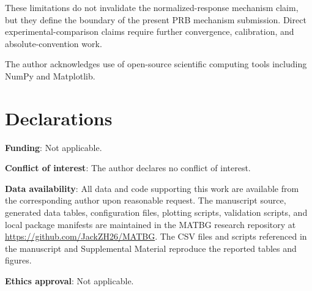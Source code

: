 \documentclass[aps,prb,preprint,superscriptaddress,floatfix,nofootinbib]{revtex4-2}
\begin{document}
These limitations do not invalidate the normalized-response mechanism claim,
but they define the boundary of the present PRB mechanism submission.  Direct
experimental-comparison claims require further convergence, calibration, and
absolute-convention work.

\begin{acknowledgments}
The author acknowledges use of open-source scientific computing tools
including NumPy and Matplotlib.
\end{acknowledgments}

\section*{Declarations}

\textbf{Funding}: Not applicable.

\textbf{Conflict of interest}: The author declares no conflict of interest.

\textbf{Data availability}: All data and code supporting this work are available
from the corresponding author upon reasonable request.  The manuscript source,
generated data tables, configuration files, plotting scripts, validation
scripts, and local package manifests are maintained in the MATBG research
repository at \url{https://github.com/JackZH26/MATBG}.  The CSV files and
scripts referenced in the manuscript and Supplemental Material reproduce the
reported tables and figures.

\textbf{Ethics approval}: Not applicable.


\end{document}
